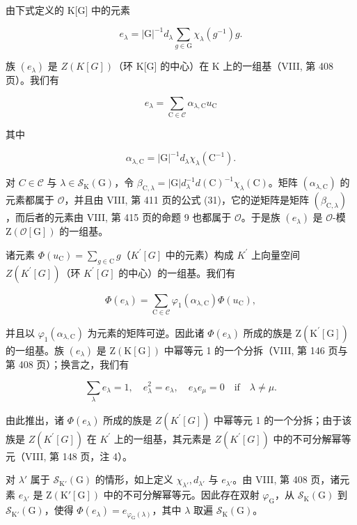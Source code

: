 由下式定义的 K{[}G{]} 中的元素

\[
e _ {\lambda} = | \mathrm{G} | ^ {- 1} d _ {\lambda} \sum_ {g \in \mathrm{G}} \chi_ {\lambda} (g ^ {- 1}) g.\tag{43}
\]

族 \((e_{\lambda})\) 是 \(Z(K[G])\)（环 K{[}G{]} 的中心）在 K 上的一组基（VIII, 第 408 页）。我们有

\[
e _ {\lambda} = \sum_ {\mathrm{C} \in \mathcal {C}} \alpha_ {\lambda , \mathrm{C}} u _ {\mathrm{C}}\tag{44}
\]

其中

\[
\alpha_ {\lambda , \mathrm{C}} = | \mathrm{G} | ^ {- 1} d _ {\lambda} \chi_ {\lambda} (\mathrm{C} ^ {- 1}).\tag{45}
\]

对 \(C \in \mathcal{C}\) 与 \(\lambda \in \mathcal{S}_{\mathrm{K}}(\mathrm{G})\)，令 \(\beta_{\mathrm{C},\lambda} = |\mathrm{G}| d_{\lambda}^{-1} d(\mathrm{C})^{-1} \chi_{\lambda}(\mathrm{C})\)。矩阵 \((\alpha_{\lambda,\mathrm{C}})\) 的元素都属于 \(\mathcal{O}\)，并且由 VIII, 第 411 页的公式 (31)，它的逆矩阵是矩阵 \((\beta_{\mathrm{C},\lambda})\)，而后者的元素由 VIII, 第 415 页的命题 9 也都属于 \(\mathcal{O}\)。于是族 \((e_{\lambda})\) 是 \(\mathcal{O}\)-模 \(\mathrm{Z}(\mathcal{O}[\mathrm{G}])\) 的一组基。

诸元素 \(\Phi(u_{\mathrm{C}}) = \sum_{g\in \mathrm{C}}g\)（\(K^{\prime}[G]\) 中的元素）构成 \(K^{\prime}\) 上向量空间 \(Z(K^{\prime}[G])\)（环 \(K^{\prime}[G]\) 的中心）的一组基。我们有

\[
\Phi (e _ {\lambda}) = \sum_ {\mathrm{C} \in \mathcal {C}} \varphi_ {1} (\alpha_ {\lambda , \mathrm{C}}) \Phi (u _ {\mathrm{C}}),\tag{46}
\]

并且以 \(\varphi_{1}(\alpha_{\lambda,\mathrm{C}})\) 为元素的矩阵可逆。因此诸 \(\Phi(e_{\lambda})\) 所成的族是 \(\mathrm{Z}(\mathrm{K}^{\prime}[\mathrm{G}])\) 的一组基。族 \((e_{\lambda})\) 是 \(\mathrm{Z}(\mathrm{K}[\mathrm{G}])\) 中幂等元 1 的一个分拆（VIII, 第 146 页与第 408 页）；换言之，我们有

\[
\sum_ {\lambda} e _ {\lambda} = 1, \quad e _ {\lambda} ^ {2} = e _ {\lambda}, \quad e _ {\lambda} e _ {\mu} = 0 \quad \mathrm{if} \quad \lambda \neq \mu .
\]

由此推出，诸 \(\Phi(e_{\lambda})\) 所成的族是 \(Z(K^{\prime}[G])\) 中幂等元 1 的一个分拆；由于该族是 \(Z(K^{\prime}[G])\) 在 \(K^{\prime}\) 上的一组基，其元素是 \(Z(K^{\prime}[G])\) 中的不可分解幂等元（VIII, 第 148 页，注 4）。

对 \(\lambda'\) 属于 \(\mathcal{S}_{\mathrm{K}'}(\mathrm{G})\) 的情形，如上定义 \(\chi_{\lambda'}, d_{\lambda'}\) 与 \(e_{\lambda'}\)。由 VIII, 第 408 页，诸元素 \(e_{\lambda'}\) 是 \(\mathrm{Z}(\mathrm{K}'[\mathrm{G}])\) 中的不可分解幂等元。因此存在双射 \(\varphi_{\mathrm{G}}\)，从 \(\mathcal{S}_{\mathrm{K}}(\mathrm{G})\) 到 \(\mathcal{S}_{\mathrm{K}'}(\mathrm{G})\)，使得 \(\Phi(e_{\lambda}) = e_{\varphi_{\mathrm{G}}(\lambda)}\)，其中 \(\lambda\) 取遍 \(\mathcal{S}_{\mathrm{K}}(\mathrm{G})\)。

